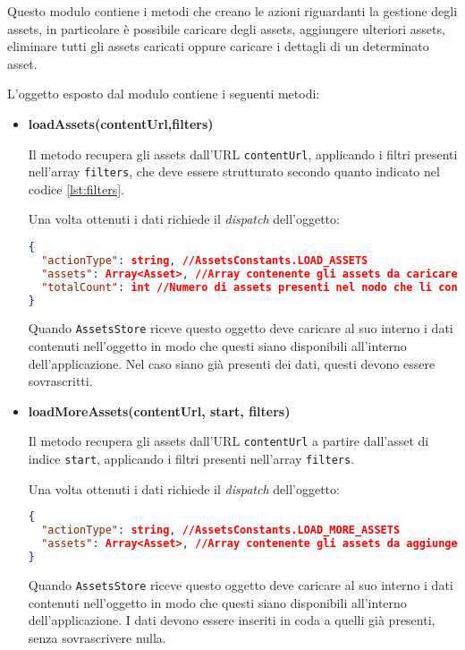 
Questo modulo contiene i metodi che creano le azioni riguardanti la gestione degli assets, in particolare è possibile caricare degli assets, aggiungere ulteriori assets, eliminare tutti gli assets caricati oppure caricare i dettagli di un determinato asset.

L'oggetto esposto dal modulo contiene i seguenti metodi:
\begin{itemize}
\item \textbf{loadAssets(contentUrl,filters)}

Il metodo recupera gli assets dall'URL \texttt{contentUrl}, applicando i filtri presenti nell'array \texttt{filters}, che deve essere strutturato secondo quanto indicato nel codice \ref{lst:filters}.

Una volta ottenuti i dati richiede il \textit{dispatch} dell'oggetto:
\begin{lstlisting}[language=JSON, caption=Action: load assets]
{
  "actionType": string, //AssetsConstants.LOAD_ASSETS
  "assets": Array<Asset>, //Array contenente gli assets da caricare
  "totalCount": int //Numero di assets presenti nel nodo che li contiene
}
\end{lstlisting}

Quando \texttt{AssetsStore} riceve questo oggetto deve caricare al suo interno i dati contenuti nell'oggetto in modo che questi siano disponibili all'interno dell'applicazione. Nel caso siano già presenti dei dati, questi devono essere sovrascritti.

\item \textbf{loadMoreAssets(contentUrl, start, filters)}

Il metodo recupera gli assets dall'URL \texttt{contentUrl} a partire dall'asset di indice \texttt{start}, applicando i filtri presenti nell'array \texttt{filters}.

Una volta ottenuti i dati richiede il \textit{dispatch} dell'oggetto:
\begin{lstlisting}[language=JSON, caption=Action: load more assets]
{
  "actionType": string, //AssetsConstants.LOAD_MORE_ASSETS
  "assets": Array<Asset>, //Array contenente gli assets da aggiungere in coda agli assets attuali
}
\end{lstlisting}

Quando \texttt{AssetsStore} riceve questo oggetto deve caricare al suo interno i dati contenuti nell'oggetto in modo che questi siano disponibili all'interno dell'applicazione.
I dati devono essere inseriti in coda a quelli già presenti, senza sovrascrivere nulla.


\end{itemize}
